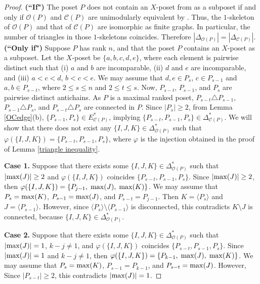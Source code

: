\documentclass[12pt]{amsart}
\theoremstyle{definition}
\let\phi=\varphi
\begin{document}
\begin{proof}
{\bf (``If")}
The poset $P$ does not contain an $X$-poset from as a subposet if and only if $\mathcal{O}(P)$ and $\mathcal{C}(P)$ are unimodularly equivalent by \cite[Theorem 2.1]{HL2}.
Thus, the $1$-skeleton of $\mathcal{O}(P)$ and that of $\mathcal{C}(P)$ are isomorphic as finite graphs.
In particular, the number of triangles in those $1$-skeletons coincides. 
Therefore $|\Delta_{\mathcal{O}(P)}| = |\Delta_{\mathcal{C}(P)}|$.
\\
{\bf (``Only if")}
Suppose $P$ has rank $n$, and that the poset $P$ contains an $X$-poset as a subposet.
Let the $X$-poset be $\{a, b, c, d, e\}$, where each element is pairwise distinct such that (i) $a$ and $b$ are incomparable, (ii) $d$ and $e$ are incomparable, and (iii) $a < c < d$, $b < c < e$.
We may assume that $d, e \in P_{s}$, $ c \in P_{s - 1}$ and $a, b \in P_{s - t}$, where $2 \leq s \leq n$ and $2 \leq t \leq s$.
Now, $P_{s - t}$, $P_{s -1}$, and $P_{s}$ are pairwise distinct antichains.
As $P$ is a maximal ranked poset, $P_{s - t} \triangle P_{s -1}$, $P_{s - 1} \triangle P_{s}$, and $P_{s - t} \triangle P_{s}$ are connected in $P$.
Since $|P_{s}| \geq 2$, from Lemma \ref{OCedge}(b), $\{P_{s -1}, P_{s}\} \in E^{*}_{\mathcal{C}(P)}$, implying $\{P_{s- t}, P_{s - 1}, P_{s}\} \in \Delta^{*}_{\mathcal{C}(P)}$. 
We will show that there does not exist any $\{I, J, K\} \in \Delta^{*}_{\mathcal{O}(P)}$ such that $\phi(\{I, J, K\}) = \{P_{s - t}, P_{s - 1}, P_{s}\}$, where $\phi$ is the injection obtained in the proof of Lemma \ref{triangle inequality}.



\medskip
\noindent
{\bf Case 1.}
Suppose that there exists some $\{I, J, K\} \in \Delta^{*}_{\mathcal{O}(P)}$ such that $|{\rm max}(J)| \geq 2$ and $\phi(\{I, J, K\})$ coincides $\{P_{s - t}, P_{s - 1}, P_{s}\}$.
Since $|{\rm max}(J)| \geq 2$, then $\phi(\{I, J, K\}) = \{P_{j-1},\; {\rm max}(J),\; {\rm max}(K)\}$.
We may assume that $P_s = {\rm max}(K)$, $P_{s-1} = {\rm max}(J)$, and $P_{s-t} = P_{j-1}$.
Then $K = \langle P_{s} \rangle$ and $J = \langle P_{s-1} \rangle$.
However, since $\langle P_{s} \rangle \setminus \langle P_{s -1} \rangle$ is disconnected, this contradicts $K \setminus J$ is connected, because $\{I, J, K\} \in \Delta^{*}_{\mathcal{O}(P)}$.   



\medskip
\noindent
{\bf Case 2.}
Suppose that there exists some $\{I, J, K\} \in \Delta^{*}_{\mathcal{O}(P)}$ such that $|{\rm max}(J)| = 1$, $k - j \neq 1$, and $\phi(\{I, J, K\})$ coincides $\{P_{s - t}, P_{s - 1}, P_{s}\}$.
Since $|{\rm max}(J)| = 1$ and $k - j \neq 1$, then $\phi(\{I, J, K\}) = \{P_{k-1},\; {\rm max}(J),\; {\rm max}(K)\}$.
We may assume that $P_s = {\rm max}(K)$, $P_{s-1} = P_{k-1}$, and $P_{s-t} = {\rm max}(J)$.
However, Since $|P_{s-t}| \geq 2$, this contradicts $|{\rm max}(J)| = 1$. 




\end{proof}
\end{document}
